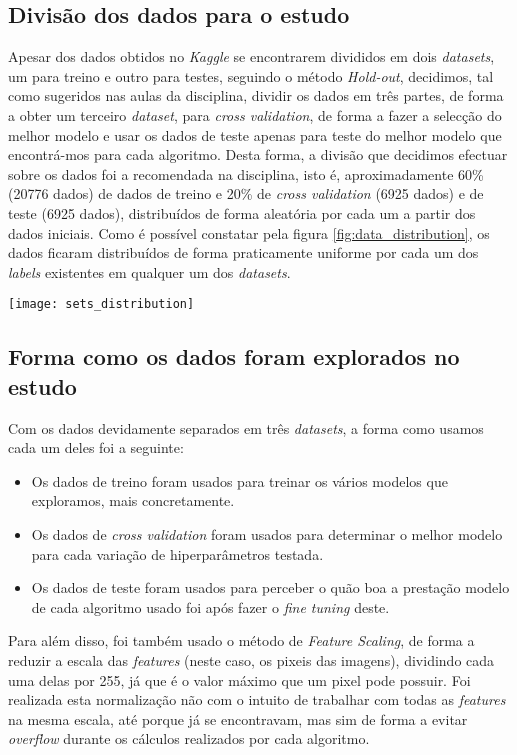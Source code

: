 \subsection{Divisão dos dados para o estudo}

Apesar dos dados obtidos no \textit{Kaggle} se encontrarem divididos em dois \textit{datasets}, um para treino e outro para testes, seguindo o método \textit{Hold-out}, decidimos, tal como sugeridos nas aulas da disciplina, dividir os dados em três partes, de forma a obter um terceiro \textit{dataset}, para \textit{cross validation}, de forma a fazer a selecção do melhor modelo e usar os dados de teste apenas para teste do melhor modelo que encontrá-mos para cada algoritmo.
Desta forma, a divisão que decidimos efectuar sobre os dados foi a recomendada na disciplina, isto é, aproximadamente 60\% (20776 dados) de dados de treino e 20\% de \textit{cross validation} (6925 dados) e de teste (6925 dados), distribuídos de forma aleatória por cada um a partir dos dados iniciais. Como é possível constatar pela figura \ref{fig:data_distribution}, os dados ficaram distribuídos de forma praticamente uniforme por cada um dos \textit{labels} existentes em qualquer um dos \textit{datasets}.
\begin{figure*}[!t]
	\centering
	\texttt{[image: sets\_distribution]}
	\caption{Distribuição de dados por \textit{label} por \textit{dataset}.}
	\label{fig:data_distribution}
\end{figure*}

\subsection{Forma como os dados foram explorados no estudo}
Com os dados devidamente separados em três \textit{datasets}, a forma como usamos cada um deles foi a seguinte:
\begin{itemize}
\item Os dados de treino foram usados para treinar os vários modelos que exploramos, mais concretamente.
\item Os dados de \textit{cross validation} foram usados para determinar o melhor modelo para cada variação de hiperparâmetros testada.
\item Os dados de teste foram usados para perceber o quão boa a prestação modelo de cada algoritmo usado foi após fazer o \textit{fine tuning} deste.
\end{itemize}
Para além disso, foi também usado o método de \textit{Feature Scaling}, de forma a reduzir a escala das \textit{features} (neste caso, os pixeis das imagens), dividindo cada uma delas por 255, já que é o valor máximo que um pixel pode possuir. Foi realizada esta normalização não com o intuito de trabalhar com todas as \textit{features} na mesma escala, até porque já se encontravam, mas sim de forma a evitar \textit{overflow} durante os cálculos realizados por cada algoritmo.
